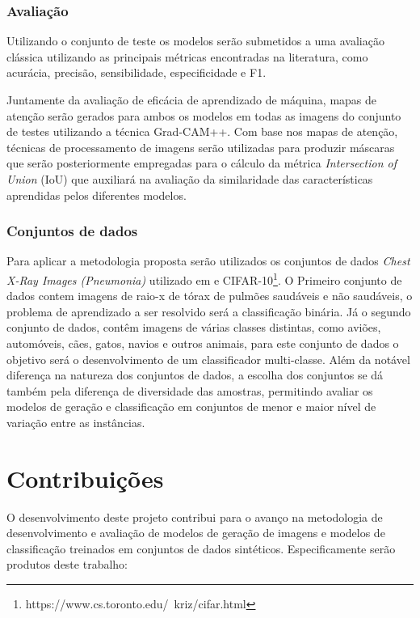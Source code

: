 \subsubsection{Avaliação}

Utilizando o conjunto de teste os modelos serão submetidos a uma avaliação clássica utilizando as principais métricas encontradas na literatura, como acurácia, precisão, sensibilidade, especificidade e F1.

Juntamente da avaliação de eficácia de aprendizado de máquina, mapas de atenção serão gerados para ambos os modelos em todas as imagens do conjunto de testes utilizando a técnica Grad-CAM++. Com base nos mapas de atenção, técnicas de processamento de imagens serão utilizadas para produzir máscaras que serão posteriormente empregadas para o cálculo da métrica \textit{Intersection of Union} (IoU) que auxiliará na avaliação da similaridade das características aprendidas pelos diferentes modelos.

\subsubsection{Conjuntos de dados}

Para aplicar a metodologia proposta serão utilizados os conjuntos de dados \textit{Chest X-Ray Images (Pneumonia)} utilizado em  e CIFAR-10\footnote{https://www.cs.toronto.edu/~kriz/cifar.html}. O Primeiro conjunto de dados contem imagens de raio-x de tórax de pulmões saudáveis e não saudáveis, o problema de aprendizado a ser resolvido será a classificação binária. Já o segundo conjunto de dados, contêm imagens de várias classes distintas, como aviões, automóveis, cães, gatos, navios e outros animais, para este conjunto de dados o objetivo será o desenvolvimento de um classificador multi-classe.
Além da notável diferença na natureza dos conjuntos de dados, a escolha dos conjuntos se dá também pela diferença de diversidade das amostras, permitindo avaliar os modelos de geração e classificação em conjuntos de menor e maior nível de variação entre as instâncias.

\section{Contribuições}
O desenvolvimento deste projeto contribui para o avanço na metodologia de desenvolvimento e avaliação de modelos de geração de imagens e modelos de classificação treinados em conjuntos de dados sintéticos. Especificamente serão produtos deste trabalho:

